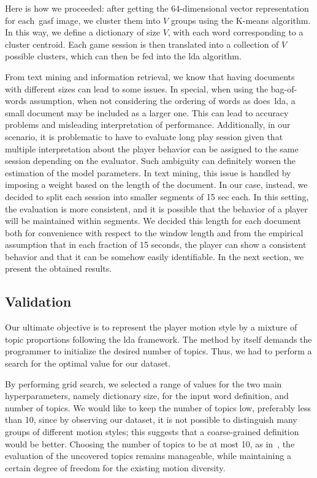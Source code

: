 Here is how we proceeded: after getting the 64-dimensional vector representation for each~\gls{gasf} image, we cluster them into $V$ groups using the K-means algorithm. In this way, we define a dictionary of size $V$, with each word corresponding to a cluster centroid. Each game session is then translated into a collection of $V$ possible clusters, which can then be fed into the \gls{lda} algorithm.

From text mining and information retrieval, we know that having documents with different sizes can lead to some issues. In special, when using the bag-of-words assumption, \ie when not considering the ordering of words as does~\gls{lda}, a small document may be included as a larger one. This can lead to accuracy problems and misleading interpretation of performance. Additionally, in our scenario, it is problematic to have to evaluate long play session given that multiple interpretation about the player behavior can be assigned to the same session depending on the evaluator. Such ambiguity can definitely worsen the estimation of the model parameters.
In text mining, this issue is handled by imposing a weight based on the length of the document. In our case, instead, we decided to split each session into smaller segments of 15 sec each. In this setting, the evaluation is more consistent, and it is possible that the behavior of a player will be maintained within segments. We decided this length for each document both for convenience with respect to the window length and from the empirical assumption that in each fraction of 15 seconds, the player can show a consistent behavior and that it can be somehow easily identifiable. In the next section, we present the obtained results.

\subsection{Validation}

Our ultimate objective is to represent the player motion style by a mixture of topic proportions following the \gls{lda} framework. The method by itself demands the programmer to initialize the desired number of topics. Thus, we had to perform a search for the optimal value for our dataset.

By performing grid search, we selected a range of values for the two main hyperparameters, namely dictionary size, for the input word definition, and number of topics. We would like to keep the number of topics low, preferably less than 10, since by observing our dataset, it is not possible to distinguish many groups of different motion styles; this suggests that a coarse-grained definition would be better. Choosing the number of topics to be at most 10, as in~\cite{smith_mining_2016}, the evaluation of the uncovered topics remains manageable, while maintaining a certain degree of freedom for the existing motion diversity.

